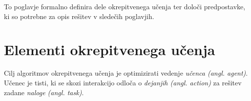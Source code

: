 \documentclass[a4paper, oneside, 12pt]{report}
\begin{document}
To poglavje formalno definira dele okrepitvenega učenja ter določi predpostavke, ki so potrebne za opis rešitev v sledečih poglavjih.

\section{Elementi okrepitvenega učenja} \label{section:ReinforcementLearningElements}

Cilj algoritmov okrepitvenega učenja je optimizirati vedenje {\em učenca (angl. agent)}. Učenec je tisti, ki se skozi interakcijo odloča o {\em dejanjih (angl. action)} za rešitev zadane {\em naloge (angl. task)}.
\end{document}
